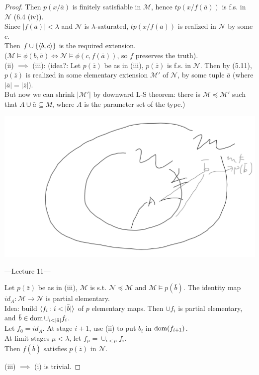 \documentclass[a4paper]{article}
\begin{document}
\begin{thm}
\begin{proof}
        Then $p(x/\bar{a})$ is finitely satisfiable in $\mathcal{M}$, hence $tp(x/f(\bar{a}))$ is f.s. in $\mathcal{N}$ (6.4 (iv)).\\
        Since $|f(\bar{a})| < \lambda$ and $\mathcal{N}$ is $\lambda$-saturated, $tp(x/f(\bar{a}))$ is realized in $\mathcal{N}$ by some $c$.\\
        Then $f \cup \{\langle b,c\rangle \}$ is the required extension.\\
        ($\mathcal{M} \vDash \phi(b,\bar{a}) \iff \mathcal{N} \vDash \phi(c,f(\bar{a}))$, so $f$ preserves the truth).\\
        (ii) $\implies$ (iii): (idea?: Let $p(\bar{z})$ be as in (iii), $p(\bar{z})$ is f.s. in $\mathcal{N}$. Then by (5.11), $p(\bar{z})$ is realized in some elementary extension $\mathcal{M}'$ of $\mathcal{N}$, by some tuple $\bar{a}$ (where $|\bar{a}| = |\bar{z}|$).\\
        But now we can shrink $|\mathcal{M}'|$ by downward L-S theorem: there is $\mathcal{M} \preccurlyeq\mathcal{M}'$ such that $A \cup \bar{a} \subseteq M$, where $A$ is the parameter set of the type.)

        \includegraphics[scale=0.5]{image/Model_10.png}
        
        ---Lecture 11---

        Let $p(\bar{z})$ be as in (iii), $\mathcal{M}$ is s.t. $\mathcal{N} \preccurlyeq\mathcal{M}$ and $\mathcal{M} \vDash p(\bar{b})$. The identity map $id_A:\mathcal{M} \to \mathcal{N}$ is partial elementary.\\
        Idea: build $\langle f_i:i < |\bar{b}| \rangle$ of $p$ elementary maps. Then $\cup f_i$ is partial elementary, and $\bar{b} \in \operatorname{dom} \cup_{i < |\bar{a}|} f_i$.\\
        Let $f_0 = id_A$. At stage $i+1$, use (ii) to put $b_i$ in $\operatorname{dom} (f_{i+1})$.\\
        At limit stages $\mu < \lambda$, let $f_\mu = \cup_{i < \mu} f_i$.\\
        Then $f(\bar{b})$ satisfies $p(\bar{z})$ in $\mathcal{N}$.

        (iii) $\implies$ (i) is trivial.
    \end{proof}
\end{thm}
\end{document}
